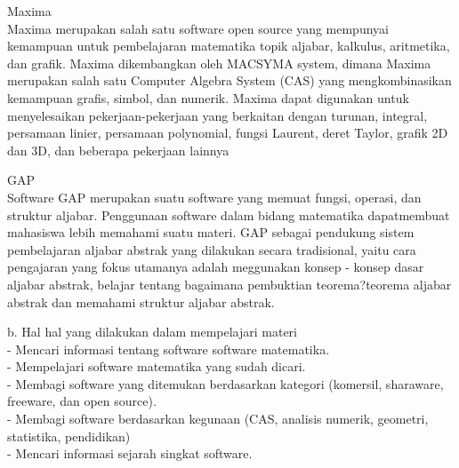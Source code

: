 \documentclass[a4paper,10pt]{article}
\begin{document}
\begin{eulernotebook}
\begin{eulercomment}
Maxima\\
Maxima merupakan salah satu software open source yang mempunyai
kemampuan untuk pembelajaran matematika topik aljabar, kalkulus,
aritmetika, dan grafik. Maxima dikembangkan oleh MACSYMA system,
dimana Maxima merupakan salah satu Computer Algebra System (CAS) yang
mengkombinasikan kemampuan grafis, simbol, dan numerik. Maxima dapat
digunakan untuk menyelesaikan pekerjaan-pekerjaan yang berkaitan
dengan turunan, integral, persamaan linier, persamaan polynomial,
fungsi Laurent, deret Taylor, grafik 2D dan 3D, dan beberapa pekerjaan
lainnya

GAP\\
Software GAP merupakan suatu software yang memuat fungsi, operasi, dan
struktur aljabar. Penggunaan software dalam bidang matematika
dapatmembuat mahasiswa lebih memahami suatu materi. GAP sebagai
pendukung sistem pembelajaran aljabar abstrak yang dilakukan secara
tradisional, yaitu cara pengajaran yang fokus utamanya adalah
meggunakan konsep - konsep dasar aljabar abstrak, belajar tentang
bagaimana pembuktian teorema?teorema aljabar abstrak dan memahami
struktur aljabar abstrak.


b. Hal hal yang dilakukan dalam mempelajari materi\\
- Mencari informasi tentang software software matematika.\\
- Mempelajari software matematika yang sudah dicari.\\
- Membagi software yang ditemukan berdasarkan kategori (komersil,
sharaware, freeware, dan open source).\\
- Membagi software berdasarkan kegunaan (CAS, analisis numerik,
geometri, statistika, pendidikan)\\
- Mencari informasi sejarah singkat software.


\end{eulercomment}
\end{eulernotebook}
\end{document}
